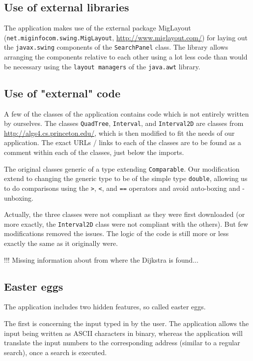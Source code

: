 \documentclass[a4paper,11pt]{article}
\begin{document}
\subsection{Use of external libraries}
The application makes use of the external package MigLayout (\texttt{net.miginfocom.swing.MigLayout}, \url{http://www.miglayout.com/}) for laying out the \texttt{javax.swing} components of the \texttt{SearchPanel} class. The library allows arranging the components relative to each other using a lot less code than would be necessary using the \texttt{layout managers} of the \texttt{java.awt} library.

\subsection{Use of "external" code}
A few of the classes of the application contains code which is not entirely written by ourselves. The classes \texttt{QuadTree}, \texttt{Interval}, and \texttt{Interval2D} are classes from \url{http://algs4.cs.princeton.edu/}, which is then modified to fit the needs of our application. The exact URLs / links to each of the classes are to be found as a comment within each of the classes, just below the imports.

The original classes generic of a type extending \texttt{Comparable}. Our modification extend to changing the generic type to be of the simple type \texttt{double}, allowing us to do comparisons using the \texttt{>}, \texttt{<}, and \texttt{==} operators and avoid auto-boxing and -unboxing.

Actually, the three classes were not compliant as they were first downloaded (or more exactly, the \texttt{Interval2D} class were not compliant with the others). But few modifications removed the issues. The logic of the code is still more or less exactly the same as it originally were.

!!! Missing information about from where the Dijkstra is found...

\subsection{Easter eggs}
\label{sec:Imp, Easter eggs}
The application includes two hidden features, so called easter eggs.

The first is concerning the input typed in by the user. The application allows the input being written as ASCII characters in binary, whereas the application will translate the input numbers to the corresponding address (similar to a regular search), once a search is executed.
\end{document}
